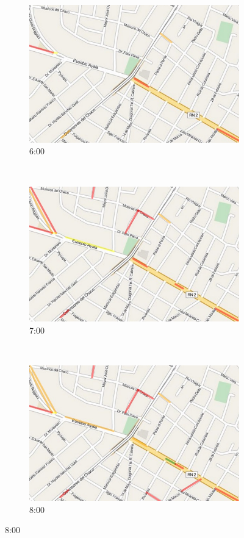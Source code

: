 \begin{figure}[!htbp]
	\centering
	\begin{subfigure}[b]{0.30\textwidth}
		\includegraphics[width=\textwidth]{capitulos/7/figuras/6.jpg}
		\caption{6:00}
	\end{subfigure}
	~~
	\begin{subfigure}[b]{0.30\textwidth}
		\includegraphics[width=\textwidth]{capitulos/7/figuras/7.jpg}
		\caption{7:00}		
	\end{subfigure}
	~~
	\begin{subfigure}[b]{0.30\textwidth}
		\includegraphics[width=\textwidth]{capitulos/7/figuras/8.jpg}
		\caption{8:00}
	\end{subfigure}
	

\end{figure}
